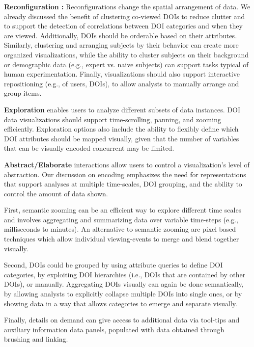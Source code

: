 \noindent \textbf{Reconfiguration :}
Reconfigurations change the spatial arrangement of data.  We already discussed the benefit of clustering co-viewed DOIs to reduce clutter and to support the detection of correlations between DOI categories and when they are viewed. Additionally, DOIs should be orderable based on their attributes. Similarly, clustering and arranging subjects by their behavior can create more organized visualizations, while the ability to cluster subjects on their background or demographic data (e.g., expert vs. naive subjects) can support tasks typical of human experimentation. Finally, visualizations should also support interactive repositioning (e.g., of users, DOIs), to allow analysts to manually arrange and group items.


\noindent \textbf{Exploration} enables users to analyze different subsets of data instances. DOI data visualizations should support time-scrolling, panning, and zooming efficiently. Exploration options also include the ability to flexibly define which DOI attributes should be mapped visually, given that the number of variables that can be visually encoded concurrent may be limited. 
	
\noindent \textbf{Abstract/Elaborate} interactions allow users to control a visualization's level of abstraction. Our discussion on encoding emphasizes the need for representations that support analyses at multiple time-scales, DOI grouping, and the ability to control the amount of data shown. 

First, semantic zooming can be an efficient way to explore different time scales and involves aggregating and summarizing data over variable time-steps (e.g., milliseconds to minutes). An alternative to semantic zooming are pixel based techniques which allow individual viewing-events to merge and blend together visually\cite{keim2000designing}. 

Second, DOIs could be grouped by using attribute queries to define DOI categories, by exploiting DOI hierarchies (i.e., DOIs that are contained by other DOIs), or manually. Aggregating DOIs visually can again be done semantically, by allowing analysts to explicitly collapse multiple DOIs into single ones, or by showing data in a way that allows categories to emerge and separate visually. 

 Finally, details on demand can give access to additional data via tool-tips and auxiliary information data panels, populated with data obtained through brushing and linking.
  
